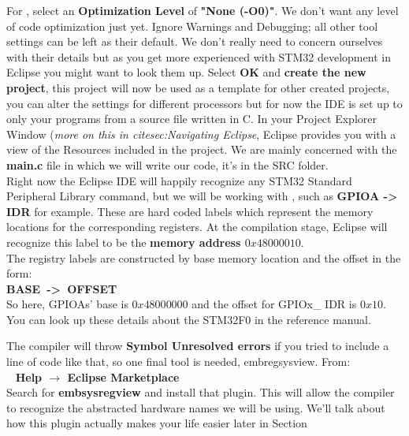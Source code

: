 {{\par
For \underline{}, select an \textbf{\color{Purple} Optimization Level} of \textbf{\color{Purple} "None (-O0)"}. We don't want any level of code optimization just yet. Ignore Warnings and Debugging; all other tool settings can be left as their default. We don't really need to concern ourselves with their details but as you get more experienced with STM32 development in Eclipse you might want to look them up. Select \textbf{\color{Purple} OK} and \textbf{create the new project}, this project will now be used as a template for other created projects, you can alter the settings for different processors but for now the IDE is set up to only \underline{} your programs from a source file written in C.
\newpage
In your Project Explorer Window (\emph{more on this in cite{sec:Navigating Eclipse}}, Eclipse provides you with a view of the Resources included in the project.  We are mainly concerned with the \textbf{\color{Aquamarine} main.c} file in which we will write our code, it's in the SRC folder.
\\
Right now the Eclipse IDE will happily recognize any STM32 Standard Peripheral Library command, but we will be working with \underline{}, such as \textbf{GPIOA -> IDR} for example. These are hard coded labels which represent the memory locations for the corresponding registers. At the compilation stage, Eclipse  will recognize this label to be the \textbf{memory address $0x4800 0010$}.\\
The registry labels are constructed by base memory location and the offset in the form:\\ \textbf{BASE~->~OFFSET}
\\
So here, GPIOAs' base is $0x4800 0000$ and the offset for GPIOx\_ IDR is $0x10$. You can look up these details about the STM32F0 in the reference manual.
\par
The compiler will throw \textbf{\color{Red} Symbol Unresolved errors} if you tried to include a line of code like that, so one final tool is needed, embregsysview. From:\\
\-\ \hspace{20pt} \textbf{\color{Green} Help $\rightarrow$ Eclipse Marketplace}
\\
Search for \textbf{\color{Purple} embsysregview} and install that plugin. This will allow the compiler to recognize the abstracted hardware names we will be using. We'll talk about how this plugin actually makes your life easier later in Section \cite{sec: Emgsysregview}
}}
